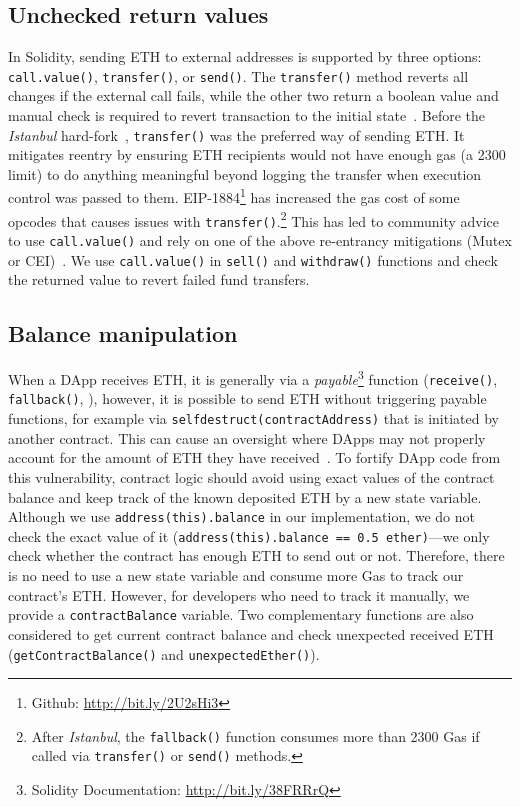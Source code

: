 \subsection{Unchecked return values}
In Solidity, sending ETH to external addresses is supported by three options: \texttt{call.value()}, \texttt{transfer()}, or \texttt{send()}. The \texttt{transfer()} method reverts all changes if the external call fails, while the other two return a boolean value and manual check is required to revert transaction to the initial state~\cite{SoliditySendEther}. Before the \textit{Istanbul} hard-fork~\cite{IstanbulUpgrades}, \texttt{transfer()} was the preferred way of sending ETH. It mitigates reentry by ensuring ETH recipients would not have enough gas (\ie a 2300 limit) to do anything meaningful beyond logging the transfer when execution control was passed to them. EIP-1884\footnote{Github: \url{http://bit.ly/2U2sHi3}} has increased the gas cost of some opcodes that causes issues with \texttt{transfer()}.\footnote{After \textit{Istanbul}, the \texttt{fallback()} function consumes more than 2300 Gas if called via \texttt{transfer()} or \texttt{send()} methods.} This has led to community advice to use \texttt{call.value()} and rely on one of the above re-entrancy mitigations (\ie Mutex or CEI)~\cite{ConsensysStopTran,ChainSecurity}. We use \texttt{call.value()} in \texttt{sell()} and \texttt{withdraw()} functions and check the returned value to revert failed fund transfers.

\subsection{Balance manipulation}
\label{sec:unexpected}

When a DApp receives ETH, it is generally via a \textit{payable}\footnote{Solidity Documentation: \url{http://bit.ly/38FRRrQ}} function (\ie \texttt{receive()}, \texttt{fallback()}, \etc), however, it is possible to send ETH without triggering payable functions, for example via \texttt{selfdestruct(contractAddress)} that is initiated by another contract. This can cause an oversight where DApps may not properly account for the amount of ETH they have received~\cite{UnexpectedEth}. To fortify DApp code from this vulnerability, contract logic should avoid using exact values of the contract balance and keep track of the known deposited ETH by a new state variable. Although we use \texttt{address(this).balance} in our implementation, we do not check the exact value of it (\ie  \texttt{address(this).balance == 0.5 ether)}---we only check whether the contract has enough ETH to send out or not. Therefore, there is no need to use a new state variable and consume more Gas to track our contract's ETH. However, for developers who need to track it manually, we provide a \texttt{contractBalance} variable. Two complementary functions are also considered to get current contract balance and check unexpected received ETH (\ie \texttt{getContractBalance()} and \texttt{unexpectedEther()}).

